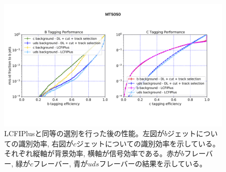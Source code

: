 \begin{figure}[htbp]
 \centering
 \includegraphics[trim = 0 150 0 200, width=1.0\textwidth, clip]{Figure/5Comparison/5-2-3-2FlavorTaggingROCCurve.png}
 \caption[LCFIPlusと同等の選別を行った後の性能]{LCFIPlusと同等の選別を行った後の性能。左図が$b$ジェットについての識別効率, 右図が$c$ジェットについての識別効率を示している。それぞれ縦軸が背景効率, 横軸が信号効率である。赤が$b$フレーバー, 緑が$c$フレーバー, 青が$uds$フレーバーの結果を示している。}
 \label{5-2-3-2FlavorTaggingROCCurve}
\end{figure}










